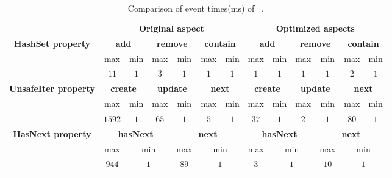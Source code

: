 \begin{table*}[!ht]
\centering
\scriptsize
\begin{tabular}{|c|c|c|c|c|c|c||c|c|c|c|c|c|}
\hline
\multirow{1}{*}{}                                                                
     & \multicolumn{6}{c||}{\bf Original aspect} & 
\multicolumn{6}{c|}{\bf Optimized aspects} \\ \cline{1-13} 
                                                                                 
 \multirow{3}{*}{\bf HashSet property}    & \multicolumn{2}{c|}{\bf add}  &
 \multicolumn{2}{c|}{\bf remove} & \multicolumn{2}{c||}{\bf contain} &
 \multicolumn{2}{c|}{\bf add}   &
 \multicolumn{2}{c|}{\bf remove} & \multicolumn{2}{c|}{\bf contain}         \\
 \cline{2-13} & max & min & max & min & max & min & max & min & max & min & max & min
 \\\cline{2-13}  
 &  $11$ & $1$   &   $3$     & $1$   &  $1$   & $1$   &   $1$    & $1$   &  $1$   
 & $1$ & $2$ & $1$\\\hline
 
  \multirow{3}{*}{\bf UnsafeIter property}    & \multicolumn{2}{c|}{\bf create} 
  & \multicolumn{2}{c|}{\bf update} & \multicolumn{2}{c||}{\bf next} &
 \multicolumn{2}{c|}{\bf create}   &
 \multicolumn{2}{c|}{\bf update} & \multicolumn{2}{c|}{\bf next}         \\
 \cline{2-13} & max & min & max & min & max & min & max & min & max & min & max & min
 \\\cline{2-13}  
 &  $1592$ & $1$   &   $65$     & $1$   &  $5$   & $1$   &   $37$    & $1$   & 
 $2$ & $1$ & $80$ & $1$\\\hline
 
   \multirow{3}{*}{\bf HasNext property}    & \multicolumn{3}{c|}{\bf hasNext} 
   & \multicolumn{3}{c||}{\bf next} &
 \multicolumn{3}{c|}{\bf hasNext}   & \multicolumn{3}{c|}{\bf next} \\
 \cline{2-13}
 
 & \multicolumn{1}{c|}{max} & \multicolumn{2}{c|}{min} &  
 \multicolumn{1}{c|}{max} & \multicolumn{2}{c||}{min} &
 \multicolumn{1}{c|}{max} & \multicolumn{2}{c|}{min} &
 \multicolumn{1}{c|}{max} & \multicolumn{2}{c|}{min}  \\\cline{2-13}  
 &   \multicolumn{1}{c|}{$944$} & \multicolumn{2}{c|}{$1$}   &  
 \multicolumn{1}{c|}{$89$} & \multicolumn{2}{c||}{$1$} &  
 \multicolumn{1}{c|}{$3$}   & \multicolumn{2}{c|}{$1$}   & 
 \multicolumn{1}{c|}{$10$}   & \multicolumn{2}{c|}{$1$}   \\\hline
 
 

\end{tabular}
\caption{Comparison of event times(ms) of \dacapo\ \bloat.}
\label{table:eventTime}
\end{table*}

